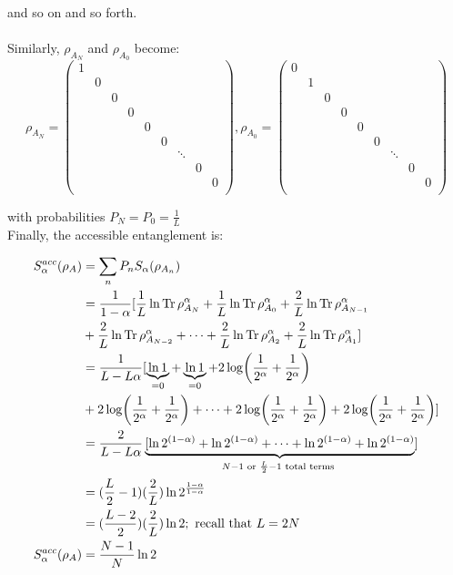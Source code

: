 and so on and so forth. \\
\\
Similarly, $\rho_{A_N}$ and $\rho_{A_0}$ become:
\begin{equation}
\rho_{A_N} = \begin{pmatrix} 
1 \\
& 0 \\
& & 0  \\
& & & 0 \\
& & & &  0 \\
& & & & & 0 \\
& & & & &  & \ddots \\
& & & & & & &  0 \\
& & & & & & & &  0 \\
\end{pmatrix} ,
\rho_{A_0} = \begin{pmatrix} 
0 \\
& 1 \\
& & 0  \\
& & & 0 \\
& & & &  0 \\
& & & & & 0 \\
& & & & &  & \ddots \\
& & & & & & &  0 \\
& & & & & & & &  0 \\
\end{pmatrix} 
\end{equation}

with probabilities $P_{N} = P_{0} = \frac{1}{L}$ \\

Finally, the accessible entanglement is:

\begin{align} 
S_{\alpha}^{acc}(\rho_A) &= \sum_{n} P_n S_{\alpha}(\rho_{A_n}) \nonumber \\
&= \frac{1}{1-\alpha}[\frac{1}{L} \ln{\operatorname{Tr}{\rho_{A_N}^\alpha}} + \frac{1}{L} \ln{\operatorname{Tr}{\rho_{A_0}^\alpha}} + \frac{2}{L} \ln{\operatorname{Tr}{\rho_{A_{N-1}}^\alpha}} \nonumber \\
&+ \frac{2}{L} \ln{\operatorname{Tr}{\rho_{A_{N-2}}^\alpha}} + \dots +\frac{2}{L} \ln{\operatorname{Tr}{\rho_{A_2}^\alpha}} + \frac{2}{L} \ln{\operatorname{Tr}{\rho_{A_1}^\alpha}} ] \nonumber \\
&= \frac{1}{L-L\alpha}[ \underbrace{\ln{1}}_{=0} +  \underbrace{\ln{1}}_{=0} + 2 \log({\frac{1}{2^\alpha}+\frac{1}{2^\alpha}}) \nonumber \\
&+ 2 \log({\frac{1}{2^\alpha}+\frac{1}{2^\alpha}})+ \dots + 2 \log({\frac{1}{2^\alpha}+\frac{1}{2^\alpha}}) + 2 \log({\frac{1}{2^\alpha}+\frac{1}{2^\alpha}}) ] \nonumber \\
&= \frac{2}{L-L\alpha}\underbrace{[\ln{2^{(1-\alpha)}} + \ln{2^{(1-\alpha)}} + \dots + \ln{2^{(1-\alpha)}} + \ln{2^{(1-\alpha)}}}_{N - 1 \text{ or } \frac{L}{2}-1\text{ total terms }}] \nonumber \\
&= (\frac{L}{2}-1)(\frac{2}{L})\ln{2^\frac{1-\alpha}{1-\alpha}} \nonumber \\
&= (\frac{L-2}{2})(\frac{2}{L})\ln{2} ; \text{ recall that } L = 2N \nonumber \\
S_{\alpha}^{acc}(\rho_A) &= \frac{N-1}{N}\ln{2}
\end{align}

